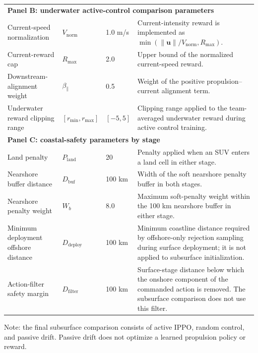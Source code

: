 \documentclass[a4paper,fleqn]{cas-dc}
\begin{document}
\begin{center}
{\begin{tabular}{@{}p{}p{}p{}p{}@{}}
\midrule
\multicolumn{4}{l}{\textbf{Panel B: underwater active-control comparison parameters}} \\
Current-speed normalization & $V_{\mathrm{norm}}$ & 1.0 m/s &
Current-intensity reward is implemented as
$\min(\|\mathbf{u}\|/V_{\mathrm{norm}},R_{\max})$. \\
Current-reward cap & $R_{\max}$ & 2.0 &
Upper bound of the normalized current-speed reward. \\
Downstream-alignment weight & $\beta_{\parallel}$ & 0.5 &
Weight of the positive propulsion--current alignment term. \\
Underwater reward clipping range & $[r_{\min},r_{\max}]$ & $[-5,5]$ &
Clipping range applied to the team-averaged underwater reward during active
control training. \\

\midrule
\multicolumn{4}{l}{\textbf{Panel C: coastal-safety parameters by stage}} \\
Land penalty & $P_{\mathrm{land}}$ & 20 &
Penalty applied when an SUV enters a land cell in either stage. \\
Nearshore buffer distance & $D_{\mathrm{buf}}$ & 100 km &
Width of the soft nearshore penalty buffer in both stages. \\
Nearshore penalty weight & $W_b$ & 8.0 &
Maximum soft-penalty weight within the 100 km nearshore buffer in either
stage. \\
Minimum deployment offshore distance & $D_{\mathrm{deploy}}$ & 100 km &
Minimum coastline distance required by offshore-only rejection sampling during
surface deployment; it is not applied to subsurface initialization. \\
Action-filter safety margin & $D_{\mathrm{filter}}$ & 100 km &
Surface-stage distance below which the onshore component of the commanded
action is removed. The subsurface comparison does not use this filter. \\
\bottomrule
\end{tabular}}
\par\smallskip
\parbox{\textwidth}{\footnotesize
Note: the final subsurface comparison consists of active IPPO, random control,
and passive drift. Passive drift does not optimize a learned propulsion policy
or reward.}
\end{center}

\clearpage
\end{document}
